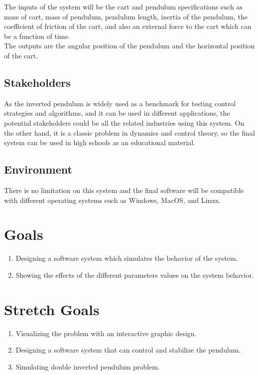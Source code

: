 \documentclass{article}
\begin{document}
The inputs of the system will be the cart and pendulum specifications such as mass of cart, mass of pendulum, pendulum length, inertia of the pendulum, the coefficient of friction of the cart, and also an external force to the cart which can be a function of time.\\
The outputs are the angular position of the pendulum and the horizontal position of the cart.

\subsection{Stakeholders}

As the inverted pendulum is widely used as a benchmark for testing control strategies and algorithms, and it can be used in different applications, the potential stakeholders could be all the related industries using this system. On the other hand, it is a classic problem in dynamics and control theory, so the final system can be used in high schools as an educational material.

\subsection{Environment}

There is no limitation on this system and the final software will be compatible with different operating systems such as Windows, MacOS, and Linux.

\section{Goals}

\begin{enumerate}
  \item Designing a software system which simulates the behavior of the system.
  \item Showing the effects of the different parameters values on the system behavior.
\end{enumerate}
\section{Stretch Goals}
\begin{enumerate}
  \item Visualizing the problem with an interactive graphic design.
  \item Designing a software system that can control and stabilize the pendulum.
  \item Simulating double inverted pendulum problem.
\end{enumerate}
\end{document}
